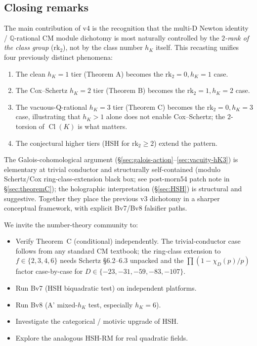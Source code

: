 \documentclass[11pt,a4paper]{amsart}
\theoremstyle{definition}
\DeclareMathOperator{\Cl}{Cl}
\newcommand{\Q}{\mathbb{Q}}
\newcommand{\hK}{h_{K}}
\newcommand{\rktwo}{\mathrm{rk}_2}
\begin{document}
\subsection{Closing remarks}\label{sec:closing-v4}

The main contribution of v4 is the recognition that the multi-D Newton identity / $\Q$-rational CM module dichotomy is most naturally controlled by the \emph{$2$-rank of the class group} ($\rktwo$), not by the class number $\hK$ itself. This recasting unifies four previously distinct phenomena:
\begin{enumerate}[leftmargin=2em]
  \item The clean $\hK = 1$ tier (Theorem A) becomes the $\rktwo = 0, \hK = 1$ case.
  \item The Cox--Schertz $\hK = 2$ tier (Theorem B) becomes the $\rktwo = 1, \hK = 2$ case.
  \item The vacuous-Q-rational $\hK = 3$ tier (Theorem C) becomes the $\rktwo = 0, \hK = 3$ case, illustrating that $\hK > 1$ alone does not enable Cox--Schertz; the $2$-torsion of $\Cl(K)$ is what matters.
  \item The conjectural higher tiers (HSH for $\rktwo \ge 2$) extend the pattern.
\end{enumerate}

The Galois-cohomological argument (\S\ref{sec:galois-action}--\ref{sec:vacuity-hK3}) is elementary at trivial conductor and structurally self-contained (modulo Schertz/Cox ring-class-extension black box; see post-morn54 patch note in \S\ref{sec:theoremC}); the holographic interpretation (\S\ref{sec:HSH}) is structural and suggestive. Together they place the previous v3 dichotomy in a sharper conceptual framework, with explicit Bv7/Bv8 falsifier paths.

We invite the number-theory community to:
\begin{itemize}[leftmargin=2em]
  \item Verify Theorem~C (conditional) independently. The trivial-conductor case follows from any standard CM textbook; the ring-class extension to $f \in \{2, 3, 4, 6\}$ needs Schertz \S6.2--6.3 unpacked and the $\prod(1 - \chi_D(p)/p)$ factor case-by-case for $D \in \{-23, -31, -59, -83, -107\}$.
  \item Run Bv7 (HSH biquadratic test) on independent platforms.
  \item Run Bv8 (A' mixed-$\hK$ test, especially $\hK = 6$).
  \item Investigate the categorical / motivic upgrade of HSH.
  \item Explore the analogous HSH-RM for real quadratic fields.
\end{itemize}
\end{document}
